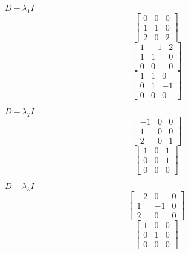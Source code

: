 \documentclass[a4paper, 12pt]{article}
\begin{document}
{\begin{enumerate}
	\begin{minipage}[t]{0.3\textwidth}
	$D - {\lambda}_1 I$
	\[
		\begin{bmatrix}
		0 & 0 & 0 \\
		1 & 1 & 0 \\
		2 & 0 & 2
		\end{bmatrix}
	\]
	\[
		\begin{bmatrix}
		1 & -1 & 2 \\
		1 & 1 & 0 \\
		0 & 0 & 0
		\end{bmatrix}
	\]
		\[
		\begin{bmatrix}
		1 & 1 & 0 \\
		0 & 1 & -1 \\
		0 & 0 & 0
		\end{bmatrix}
	\]
	\end{minipage} \quad \vline \quad \begin{minipage}[t]{0.3\textwidth}
	$D - {\lambda}_2 I$
	\[
		\begin{bmatrix}
		-1 & 0 & 0 \\
		1 & 0 & 0 \\
		2 & 0 & 1
		\end{bmatrix}
	\]
	\[
		\begin{bmatrix}
		1 & 0 & 1 \\
		0 & 0 & 1 \\
		0 & 0 & 0
		\end{bmatrix}
	\]
	\end{minipage} \quad \vline \quad \begin{minipage}[t]{0.3\textwidth}
	$D - {\lambda}_3 I$	
	\[
		\begin{bmatrix}
		-2 & 0 & 0 \\
		1 & -1 & 0 \\
		2 & 0 & 0
		\end{bmatrix}
	\]
	\[
		\begin{bmatrix}
		1 & 0 & 0 \\
		0 & 1 & 0 \\
		0 & 0 & 0
		\end{bmatrix}
	\]
	\end{minipage}
	

\end{enumerate}}
\end{document}
